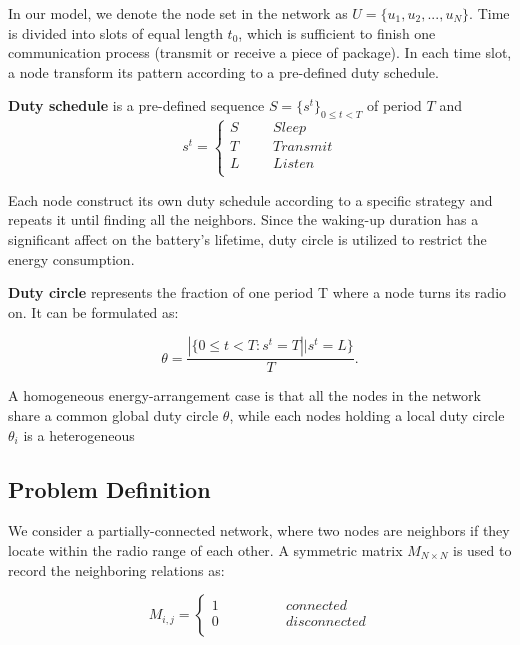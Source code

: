 In our model, we denote the node set in the network as $U = \{u_1,u_2,...,u_N\}$.
Time is divided into slots of equal length $t_0$, 
which is sufficient to finish  one communication process
(transmit or receive a piece of package). In each time slot, 
a node transform its pattern according to a pre-defined duty schedule.


\begin{definition}
\textbf{Duty schedule} is a pre-defined sequence $S=\{s^t\}_{0\leq t<T}$ of period $T$ and
$$ s^t=\left\{
\begin{aligned}
S  & & & {Sleep}\\
T  & & & {Transmit}\\
L  & & & {Listen}\\
\end{aligned}
\right.
$$
\end{definition}

 Each node construct its own duty schedule according to a specific strategy and repeats it
 until finding all the neighbors. Since the waking-up duration has a significant affect on the battery's lifetime, 
 duty circle is utilized to restrict the energy consumption.

\begin{definition}
\textbf{Duty circle} represents the fraction of one period T where a node turns its radio on. It can be formulated as:

$$\theta=\frac{|\{ 0\leq t<T : s^t = T || s^t = L\}}{T}.
$$
  
\end{definition}

A homogeneous energy-arrangement case is that all the nodes
in the network share a common global duty circle $\theta$,
while each nodes holding a local duty circle $\theta_i$ is 
a heterogeneous


\subsection{Problem Definition}

We consider a partially-connected network, 
where two nodes are neighbors if they locate within the radio range of each other. 
A  symmetric matrix $M_{N\times N}$ is used to record the neighboring relations as:

$$ M_{i,j}=\left\{
\begin{aligned}
1  & & & & & & {connected}\\
0  & & & & & & {disconnected}\\
\end{aligned}
\right.
$$

